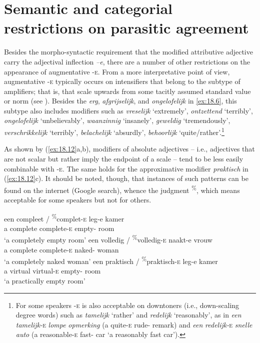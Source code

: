 \documentclass[output=paper]{langsci/langscibook}
\begin{document}
\section{Semantic and categorial restrictions on parasitic
agreement}\label{sec:18.3}

Besides the morpho-syntactic requirement that the modified attributive
adjective carry the adjectival inflection \emph{–e}, there are a number of
other restrictions on the appearance of augmentative \textsc{-e}. From a more
interpretative point of view, augmentative \textsc{-e} typically occurs on
intensifiers that belong to the subtype of amplifiers; that is, 
that scale upwards from some tacitly assumed standard value or norm (see
\citealt[104]{Broekhuis2013}). Besides the  \emph{erg},
\emph{afgrijselijk}, and \emph{ongelofelijk} in \eqref{ex:18.6}, this subtype
also includes modifiers such as \emph{vreselijk} \enquote*{extremely},
\emph{ontzettend} \enquote*{terribly}, \emph{ongelofelijk}
\enquote*{unbelievably}, \emph{waanzinnig} \enquote*{insanely}, \emph{geweldig}
\enquote*{tremendously}, \emph{verschrikkelijk} \enquote*{terribly},
\emph{belachelijk} \enquote*{absurdly}, \emph{behoor\-lijk}
\enquote*{quite/rather}.\footnote{For some speakers \textsc{-e} is also
    acceptable on downtoners (i.e., down-scaling degree words) such as
    \emph{tamelijk} \enquote*{rather} and \emph{redelijk}
    \enquote*{reasonably}, as in \emph{een} \emph{tamelijk-}\textsc{e}
    \emph{lompe} \emph{opmerking} (a quite-\textsc{e} rude-\Agr{} remark) and
\emph{een} \emph{redelijk-}\textsc{e} \emph{snelle} \emph{auto} (a
reasonable-\textsc{e} fast-\Agr{} car \enquote*{a reasonably fast car}).}

As shown by (\ref{ex:18.12}a,b), modifiers of absolute adjectives -- i.e.,
adjectives that are not scalar but rather imply the endpoint of a scale -- tend
to be less easily combinable with \textsc{-e}. The same holds for the
approximative modifier \emph{praktisch} in (\ref{ex:18.12}c). It should be
noted, though, that instances of such patterns can be found on the internet
(Google search), whence the judgment \textsuperscript{\%}, which means
acceptable for some speakers but not for others.

\ea%
    \label{ex:18.12}
	\ea
	\gll  een    compleet / \textsuperscript{\%}complet-\textsc{e}    leg-e            kamer\\
    a        complete {} \hphantom{\textsuperscript{\%}}complete-\textsc{e}      empty-\Agr{}  room\\
	\glt \enquote*{a completely empty room}
	\ex
	\gll een    volledig / \textsuperscript{\%}volledig-\textsc{e}        naakt-e        vrouw\\
    a        complete {} \hphantom{\textsuperscript{\%}}complete-\textsc{e} naked-\Agr{}  woman\\
    \glt \enquote*{a completely naked woman}
	\ex
	\gll  een    praktisch / \textsuperscript{\%}praktisch-\textsc{e}    leg-e            kamer\\
            a        virtual {} \hphantom{\textsuperscript{\%}}virtual-\textsc{e} empty-\Agr{}  room\\
    \glt \enquote*{a practically empty room}
	\z
\z
\end{document}
